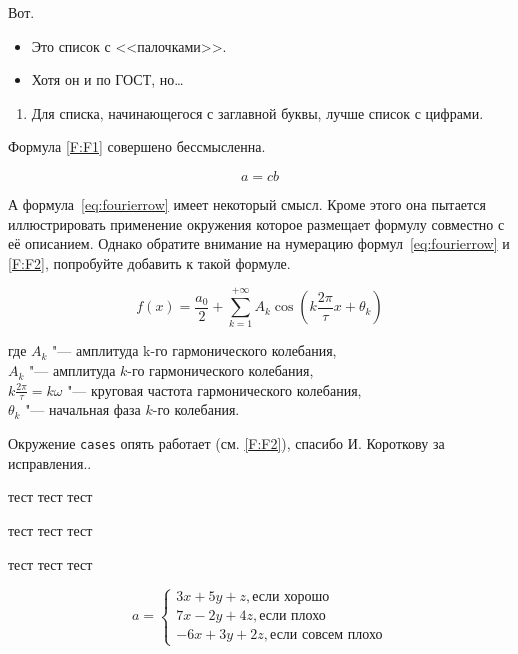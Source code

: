 Вот.

\begin{itemize}
  \item Это список с <<палочками>>.
  \item Хотя он и по ГОСТ, но\dots
\end{itemize}

\begin{enumerate}
  \item  Для списка, начинающегося с заглавной буквы, лучше список с цифрами.
\end{enumerate}

Формула \eqref{F:F1} совершено бессмысленна.


\begin{equation}
  a= cb
  \label{F:F1}
\end{equation}

А формула~\eqref{eq:fourierrow} имеет некоторый смысл.
Кроме этого она пытается иллюстрировать применение окружения  которое размещает формулу совместно с её описанием.
Однако обратите внимание на нумерацию формул~\eqref{eq:fourierrow} и \eqref{F:F2}, попробуйте добавить \Code{[H]} к такой формуле.

\begin{eqndesc}
  \begin{equation}\label{eq:fourierrow}
    f(x) = \frac{a_0}{2} + \sum\limits_{k=1}^{+\infty} A_k\cos\left(k\frac{2\pi}{\tau}x+\theta_k\right)
  \end{equation}

  где $A_k$ "--- амплитуда  k-го гармонического колебания,\\
  $A_k$ "--- амплитуда $k$-го гармонического колебания,\\
  $ k\frac{2\pi}{\tau} = k\omega$ "--- круговая частота гармонического колебания,\\
  $\theta_k$ "--- начальная фаза $k$-го колебания.
\end{eqndesc}


Окружение \texttt{cases} опять работает (см. \eqref{F:F2}), спасибо И. Короткову за исправления..

тест тест тест


тест тест тест

тест тест тест

\begin{equation}
  a= \begin{cases}
    3x + 5y + z, \mbox{если хорошо} \\
    7x - 2y + 4z, \mbox{если плохо} \\
    -6x + 3y + 2z, \mbox{если совсем плохо}
  \end{cases}
  \label{F:F2}
\end{equation}


